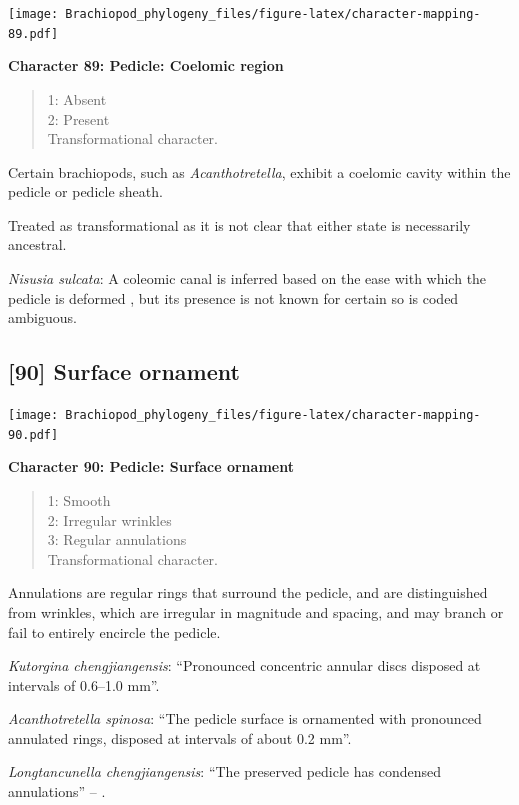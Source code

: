 \documentclass[]{book}
\theoremstyle{definition}
\theoremstyle{definition}
\theoremstyle{definition}
\theoremstyle{remark}
\begin{document}
\texttt{[image: Brachiopod\_phylogeny\_files/figure-latex/character-mapping-89.pdf]}

\textbf{Character 89: Pedicle: Coelomic region}

\begin{quote}
1: Absent\\
2: Present\\
Transformational character.
\end{quote}

Certain brachiopods, such as \emph{Acanthotretella}, exhibit a coelomic
cavity within the pedicle or pedicle sheath.

Treated as transformational as it is not clear that either state is
necessarily ancestral.

\emph{Nisusia sulcata}: A coleomic canal is inferred based on the ease
with which the pedicle is deformed
\citep{Holmer2018Evolutionarysignificance}, but its presence is not
known for certain so is coded ambiguous.

\hypertarget{surface-ornament-1}{%
\subsection*{{[}90{]} Surface ornament}\label{surface-ornament-1}}

\texttt{[image: Brachiopod\_phylogeny\_files/figure-latex/character-mapping-90.pdf]}

\textbf{Character 90: Pedicle: Surface ornament}

\begin{quote}
1: Smooth\\
2: Irregular wrinkles\\
3: Regular annulations\\
Transformational character.
\end{quote}

Annulations are regular rings that surround the pedicle, and are
distinguished from wrinkles, which are irregular in magnitude and
spacing, and may branch or fail to entirely encircle the pedicle.

\emph{Kutorgina chengjiangensis}: ``Pronounced concentric annular discs
disposed at intervals of 0.6--1.0 mm''.

\emph{Acanthotretella spinosa}: ``The pedicle surface is ornamented with
pronounced annulated rings, disposed at intervals of about 0.2 mm''.

\emph{Longtancunella chengjiangensis}: ``The preserved pedicle has
condensed annulations'' -- \citet{Zhang2011Theexceptionally}.
\end{document}
